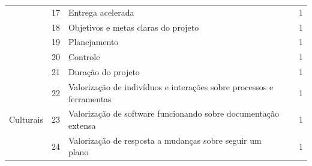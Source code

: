 \documentclass[sigconf]{acmart}
\begin{document}
\begin{table}[t]
\begin{tabular}{p{2.6cm} c p{8cm} c c}
 & 17 & Entrega acelerada                                       & \cite{Junior:2024}   & 1 \\
 & 18 & Objetivos e metas claras do projeto                     & \cite{Junior:2024}   & 1 \\
 & 19 & Planejamento                                            & \cite{Guerrero:2022} & 1 \\
 & 20 & Controle                                                & \cite{Guerrero:2022} & 1 \\
 & 21 & Duração do projeto                                      & \cite{Junior:2024}   & 1 \\
\multirow{3}{2.6cm}{Culturais}
 & 22 & Valorização de indivíduos e interações sobre processos e ferramentas & \cite{Junior:2024} & 1 \\
 & 23 & Valorização de software funcionando sobre documentação extensa       & \cite{Junior:2024} & 1 \\
 & 24 & Valorização de resposta a mudanças sobre seguir um plano             & \cite{Junior:2024} & 1 \\
\bottomrule
\end{tabular}
\end{table}



\end{document}
